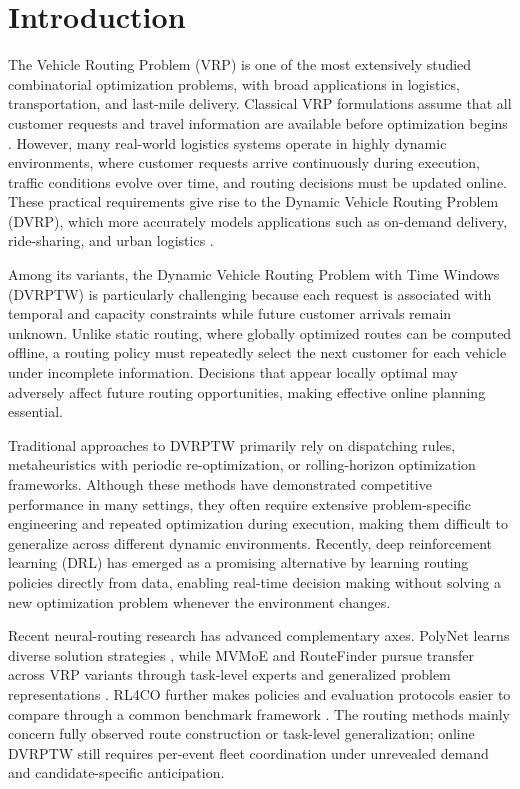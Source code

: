 \documentclass[letterpaper]{article}
\begin{document}
\begin{abstract}
\end{abstract}

\section{Introduction}\label{sec:intro}

The Vehicle Routing Problem (VRP) is one of the most extensively studied combinatorial optimization problems, with broad applications in logistics, transportation, and last-mile delivery. Classical VRP formulations assume that all customer requests and travel information are available before optimization begins \cite{toth2014vehicle}. However, many real-world logistics systems operate in highly dynamic environments, where customer requests arrive continuously during execution, traffic conditions evolve over time, and routing decisions must be updated online. These practical requirements give rise to the Dynamic Vehicle Routing Problem (DVRP), which more accurately models applications such as on-demand delivery, ride-sharing, and urban logistics \cite{psaraftis1988dynamic}.

Among its variants, the Dynamic Vehicle Routing Problem with Time Windows (DVRPTW) is particularly challenging because each request is associated with temporal and capacity constraints while future customer arrivals remain unknown. Unlike static routing, where globally optimized routes can be computed offline, a routing policy must repeatedly select the next customer for each vehicle under incomplete information. Decisions that appear locally optimal may adversely affect future routing opportunities, making effective online planning essential.

Traditional approaches to DVRPTW primarily rely on dispatching rules, metaheuristics with periodic re-optimization, or rolling-horizon optimization frameworks. Although these methods have demonstrated competitive performance in many settings, they often require extensive problem-specific engineering and repeated optimization during execution, making them difficult to generalize across different dynamic environments. Recently, deep reinforcement learning (DRL) has emerged as a promising alternative by learning routing policies directly from data, enabling real-time decision making without solving a new optimization problem whenever the environment changes.

Recent neural-routing research has advanced complementary axes. PolyNet learns diverse solution strategies
\cite{hottung2025polynet}, while MVMoE and RouteFinder pursue transfer across VRP variants through task-level experts and generalized problem representations
\cite{zhou2024mvmoe,berto2025routefinder}. RL4CO further makes policies and evaluation protocols easier to compare through a common benchmark framework
\cite{berto2025rl4co}. The routing methods mainly concern fully observed route construction or task-level generalization; online DVRPTW still requires per-event fleet coordination under unrevealed demand and candidate-specific anticipation.
\end{document}

